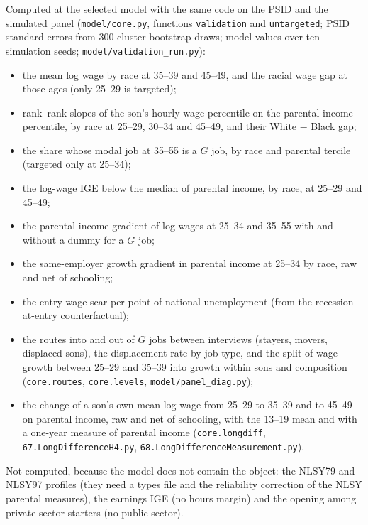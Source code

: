 \documentclass[11pt]{article}
\newcommand{\code}[1]{\texttt{#1}}
\newcommand{\1}{\mathbf{1}}
\begin{document}
Computed at the selected model with the same code on the PSID and the simulated panel (\code{model/core.py},
functions \code{validation} and \code{untargeted}; PSID standard errors from 300 cluster-bootstrap draws; model values
over ten simulation seeds; \code{model/validation\_run.py}):
\begin{itemize}
  \item the mean log wage by race at 35--39 and 45--49, and the racial wage gap at those ages (only 25--29 is targeted);
  \item rank--rank slopes of the son's hourly-wage percentile on the parental-income percentile, by race at 25--29,
  30--34 and 45--49, and their White $-$ Black gap;
  \item the share whose modal job at 35--55 is a $G$ job, by race and parental tercile (targeted only at 25--34);
  \item the log-wage IGE below the median of parental income, by race, at 25--29 and 45--49;
  \item the parental-income gradient of log wages at 25--34 and 35--55 with and without a dummy for a $G$ job;
  \item the same-employer growth gradient in parental income at 25--34 by race, raw and net of schooling;
  \item the entry wage scar per point of national unemployment (from the recession-at-entry counterfactual);
  \item the routes into and out of $G$ jobs between interviews (stayers, movers, displaced sons), the displacement rate by
  job type, and the split of wage growth between 25--29 and 35--39 into growth within sons and composition
  (\code{core.routes}, \code{core.levels}, \code{model/panel\_diag.py});
  \item the change of a son's own mean log wage from 25--29 to 35--39 and to 45--49 on parental income, raw and net of
  schooling, with the 13--19 mean and with a one-year measure of parental income (\code{core.longdiff},
  \code{67.LongDifferenceH4.py}, \code{68.LongDifferenceMeasurement.py}).
\end{itemize}
Not computed, because the model does not contain the object: the NLSY79 and NLSY97 profiles (they need a types file and
the reliability correction of the NLSY parental measures), the earnings IGE (no hours margin) and the opening among
private-sector starters (no public sector).

\end{document}
